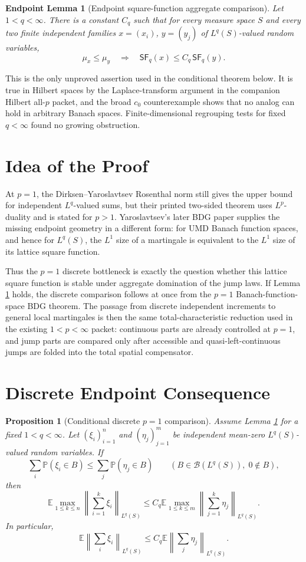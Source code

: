 \documentclass[11pt]{article}
\newtheorem{proposition}{Proposition}
\newtheorem{conjecture}{Endpoint Lemma}
\newcommand{\E}{\mathbb E}
\newcommand{\Pp}{\mathbb P}
\newcommand{\cB}{\mathcal B}
\newcommand{\Lq}{L^q(S)}
\newcommand{\sfq}{\mathsf{SF}_q}
\begin{document}
\begin{conjecture}[Endpoint square-function aggregate comparison]
\label{lem:endpoint-square}
Let \(1<q<\infty\).  There is a constant \(C_q\) such that for every measure
space \(S\) and every two finite independent families \(x=(x_i)\),
\(y=(y_j)\) of \(L^q(S)\)-valued random variables,
\[
  \mu_x\le \mu_y
  \quad\Longrightarrow\quad
  \sfq(x)\le C_q\,\sfq(y).
\]
\end{conjecture}

This is the only unproved assertion used in the conditional theorem below.
It is true in Hilbert spaces by the Laplace-transform argument in the companion
Hilbert all-\(p\) packet, and the broad \(c_0\) counterexample shows that no
analog can hold in arbitrary Banach spaces.  Finite-dimensional regrouping
tests for fixed \(q<\infty\) found no growing obstruction.

\section*{Idea of the Proof}

At \(p=1\), the Dirksen--Yaroslavtsev Rosenthal norm still gives the upper
bound for independent \(L^q\)-valued sums, but their printed two-sided theorem
uses \(L^p\)-duality and is stated for \(p>1\).  Yaroslavtsev's later BDG
paper supplies the missing endpoint geometry in a different form: for UMD
Banach function spaces, and hence for \(L^q(S)\), the \(L^1\) size of a
martingale is equivalent to the \(L^1\) size of its lattice square function.

Thus the \(p=1\) discrete bottleneck is exactly the question whether this
lattice square function is stable under aggregate domination of the jump laws.
If Lemma \ref{lem:endpoint-square} holds, the discrete comparison follows at
once from the \(p=1\) Banach-function-space BDG theorem.  The passage from
discrete independent increments to general local martingales is then the same
total-characteristic reduction used in the existing \(1<p<\infty\) packet:
continuous parts are already controlled at \(p=1\), and jump parts are compared
only after accessible and quasi-left-continuous jumps are folded into the
total spatial compensator.

\section*{Discrete Endpoint Consequence}

\begin{proposition}[Conditional discrete \(p=1\) comparison]
\label{prop:discrete}
Assume Lemma \ref{lem:endpoint-square} for a fixed \(1<q<\infty\).  Let
\((\xi_i)_{i=1}^n\) and \((\eta_j)_{j=1}^m\) be independent mean-zero
\(L^q(S)\)-valued random variables.  If
\[
   \sum_i \Pp(\xi_i\in B)
   \le
   \sum_j \Pp(\eta_j\in B)
   \qquad(B\in\cB(\Lq),\;0\notin B),
\]
then
\[
   \E\max_{1\le k\le n}
      \left\|\sum_{i=1}^k \xi_i\right\|_{L^q(S)}
   \le
   C_q
   \E\max_{1\le k\le m}
      \left\|\sum_{j=1}^k \eta_j\right\|_{L^q(S)}.
\]
In particular,
\[
   \E\left\|\sum_i \xi_i\right\|_{L^q(S)}
   \le
   C_q
   \E\left\|\sum_j \eta_j\right\|_{L^q(S)}.
\]
\end{proposition}
\end{document}
